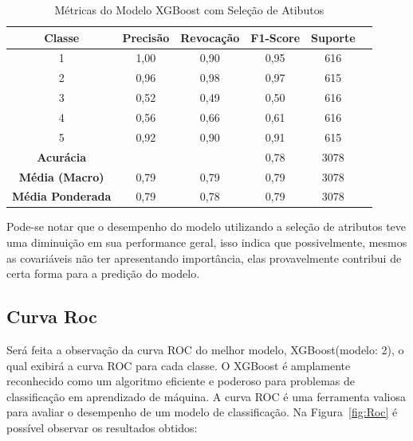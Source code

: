 \documentclass[12pt,oneside,a4paper,chapter=TITLE,
			   english,brazil]{abntex2}
\begin{document}
\begin{table}[htbp]
    \centering
    \caption[Métricas do Modelo XGBoost com Seleção de Atibutos]{Métricas do Modelo XGBoost com Seleção de Atibutos}
    \begin{tabular}{cccccc}
        \toprule
        \textbf{Classe} & \textbf{Precisão} & \textbf{Revocação} & \textbf{F1-Score} & \textbf{Suporte} \\
        \midrule
        1 & 1,00 & 0,90 & 0,95 & 616 \\
        2 & 0,96 & 0,98 & 0,97 & 615 \\
        3 & 0,52 & 0,49 & 0,50 & 616 \\
        4 & 0,56 & 0,66 & 0,61 & 616 \\
        5 & 0,92 & 0,90 & 0,91 & 615 \\
        \midrule
        \textbf{Acurácia} & & & 0,78 & 3078 \\
        \textbf{Média (Macro)} & 0,79 & 0,79 & 0,79 & 3078 \\
        \textbf{Média Ponderada} & 0,79 & 0,78 & 0,79 & 3078 \\
        \bottomrule
    \end{tabular}

    \label{tab:slection}
\end{table}
 \begin{flushleft}
\vspace{-1.0em}
\centering
{}
\end{flushleft}


Pode-se notar que  o desempenho do modelo utilizando a  seleção de atributos teve  uma diminuição em sua performance geral, isso indica que  possivelmente, mesmos as covariáveis  não ter apresentando importância, elas provavelmente contribui de certa forma para a predição do modelo.





\subsection{Curva Roc}


Será feita a observação da curva ROC do melhor modelo, XGBoost(modelo: 2), o qual exibirá a curva ROC para cada classe. O XGBoost é amplamente reconhecido como um algoritmo eficiente e poderoso para problemas de classificação em aprendizado de máquina. A curva ROC é uma ferramenta valiosa para avaliar o desempenho de um modelo de classificação. Na Figura~\ref{fig:Roc} é possível observar os resultados obtidos:
\end{document}
